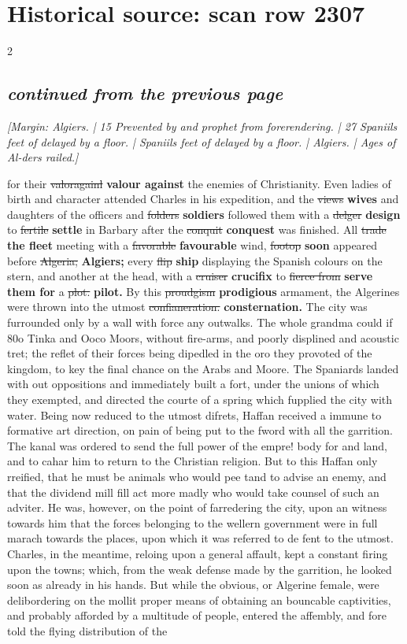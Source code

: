 \documentclass[10pt]{article}
\begin{document}
\section*{Historical source: scan row 2307}
\begin{multicols}{2}
\subsection*{\textit{continued from the previous page}}
{\small\itshape [Margin: \emph{Algiers.} | 15 Prevented by and prophet from forerendering. | 27 Spaniils feet of delayed by a floor. | Spaniils feet of delayed by a floor. | Algiers. | Ages of Al-ders railed.]}\par
for their \sout{valoragainl} \textbf{valour against} the enemies of Christianity. Even ladies of birth and character attended Charles in his expedition, and the \sout{views} \textbf{wives} and daughters of the officers and \sout{folders} \textbf{soldiers} followed them with a \sout{delger} \textbf{design} to \sout{fertile} \textbf{settle} in Barbary after the \sout{conquit} \textbf{conquest} was finished. All \sout{trade} \textbf{the fleet} meeting with a \sout{favorable} \textbf{favourable} wind, \sout{footop} \textbf{soon} appeared before \sout{Algeria;} \textbf{Algiers;} every \sout{flip} \textbf{ship} displaying the Spanish colours on the stern, and another at the head, with a \sout{cruiser} \textbf{crucifix} to \sout{fierce from} \textbf{serve them for} a \sout{plot.} \textbf{pilot.} By this \sout{proudgism} \textbf{prodigious} armament, the Algerines were thrown into the utmost \sout{confianeration.} \textbf{consternation.} The city was furrounded only by a wall with force any outwalks. The whole grandma could if 80o Tinka and Ooco Moors, without fire-arms, and poorly displined and acoustic tret; the reflet of their forces being dipedled in the oro they provoted of the kingdom, to key the final chance on the Arabs and Moore. The Spaniards landed with out oppositions and immediately built a fort, under the unions of which they exempted, and directed the courte of a spring which fupplied the city with water. Being now reduced to the utmost difrets, Haffan received a immune to formative art direction, on pain of being put to the fword with all the garrition. The kanal was ordered to send the full power of the empre! body for and land, and to cahar him to return to the Christian religion. But to this Haffan only rreified, that he must be animals who would pee tand to advise an enemy, and that the dividend mill fill act more madly who would take counsel of such an adviter. He was, however, on the point of farredering the city, upon an witness towards him that the forces belonging to the wellern government were in full marach towards the places, upon which it was referred to de fent to the utmost. Charles, in the meantime, reloing upon a general affault, kept a constant firing upon the towns; which, from the weak defense made by the garrition, he looked soon as already in his hands. But while the obvious, or Algerine female, were delibordering on the mollit proper means of obtaining an bouncable captivities, and probably afforded by a multitude of people, entered the affembly, and fore told the flying distribution of the 
\end{multicols}
\end{document}
